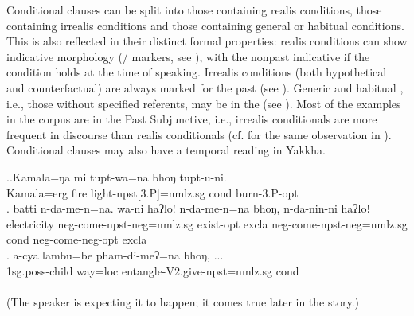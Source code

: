 \largerpage%
Conditional clauses can be split into those containing realis conditions, those containing irrealis conditions and those containing general or habitual conditions. This is also reflected in their  distinct formal properties: realis conditions can show indicative morphology (/ markers, see \Next), with the nonpast indicative if the condition holds at the time of speaking. Irrealis conditions (both hypothetical and counterfactual) are always marked for the past (see \NNext). Generic and habitual , i.e., those without specified referents, may be in the  (see \NNext[c]). Most of the examples in the  corpus are in the Past Subjunctive, i.e., irrealis conditionals are more frequent in discourse than realis conditionals (cf. \citet[463]{Genetti2007_Newari} for the same observation in ). Conditional clauses may also have a temporal reading in Yakkha. 
\largerpage


	\ex.\ag.Kamala=ŋa mi tupt-wa=na bhoŋ tupt-u-ni.\\
	Kamala{\sc =erg} fire   light{\sc -npst[3.P]=nmlz.sg} {\sc cond} burn{\sc -3.P-opt}\\
	\bg.	batti n-da-me-n=na. wa-ni haʔlo! n-da-me-n=na bhoŋ, n-da-nin-ni haʔloǃ\\
	electricity   {\sc neg-}come{\sc [3sg]-npst-neg=nmlz.sg} exist{\sc [sbjv]-opt} {\sc excla} {\sc neg-}come{\sc [3sg]-npst-neg=nmlz.sg} {\sc cond} {\sc neg-}come{\sc [3sg]-neg-opt} {\sc excla} \\
\bg. a-cya            lambu=be    pham-di-meʔ=na bhoŋ, ...\\
{\sc 1sg.poss-}child way{\sc =loc} entangle{\sc -V2.give-npst=nmlz.sg} {\sc cond}\\
  \\
(The speaker is expecting it to happen; it comes true later in the story.)

